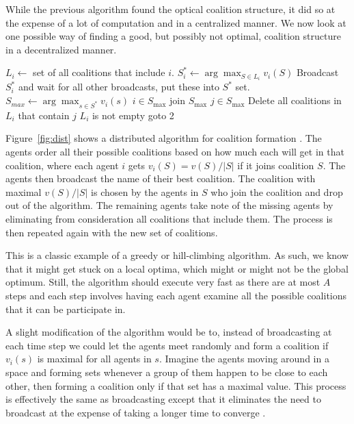 While the previous algorithm found the optical coalition structure, it
did so at the expense of a lot of computation and in a centralized
manner. We now look at one possible way of finding a good, but
possibly not optimal, coalition structure in a decentralized manner.

\begin{SCfigure}
  \begin{minipage}{1.0\linewidth}
  \begin{codebox}
    \li $L_i \gets$ set of all coalitions that include $i$. 
    \li $S_i^* \gets \arg \max_{S \in L_i} v_i(S)$
    \li Broadcast $S_i^*$ and wait for all other broadcasts, put these
    into $S^*$ set.
    \li $S_{max} \gets \arg \max _{s \in S^*} v_i(s)$ 
    \li \If $i \in S_{\max}$
    \li \Then join $S_{\max}$
    \li \Return
    \End
    \li \For $j \in S_{\max}$
        \li \Do Delete all coalitions in $L_i$ that contain $j$
        \End
    \li \If $L_i$ is not empty 
    \li \Then goto 2
    \End
    \li \Return
  \end{codebox}
  \end{minipage}
  \caption{Distributed algorithm for coalition formation. Each agent
    $i$ must execute this function. We let $v_i(S) =
    \frac{v(S)}{|S|}$}
  \label{fig:dist}
\end{SCfigure}

Figure~\ref{fig:dist} shows a distributed
algorithm for coalition formation \cite{shehory98a}. The agents order
all their possible coalitions based on how much each will get in that
coalition, where each agent $i$ gets $v_i(S) = v(S)/|S|$ if it joins
coalition $S$. The agents then broadcast the name of their best
coalition. The coalition with maximal $v(S)/|S|$ is chosen by the
agents in $S$ who join the coalition and drop out of the algorithm.
The remaining agents take note of the missing agents by eliminating
from consideration all coalitions that include them. The process is
then repeated again with the new set of coalitions.

This is a classic example of a greedy or hill-climbing algorithm. As
such, we know that it might get stuck on a local optima, which might
or might not be the global optimum. Still, the algorithm should
execute very fast as there are at most $A$ steps and each step
involves having each agent examine all the possible coalitions that it
can be participate in.

A slight modification of the algorithm would be to, instead of
broadcasting at each time step we could let the agents meet randomly
and form a coalition if $v_i(s)$ is maximal for all agents in $s$.
Imagine the agents moving around in a space and forming sets whenever
a group of them happen to be close to each other, then forming a
coalition only if that set has a maximal value. This process is
effectively the same as broadcasting except that it eliminates the
need to broadcast at the expense of taking a longer time to converge
\cite{sarne07a}.


